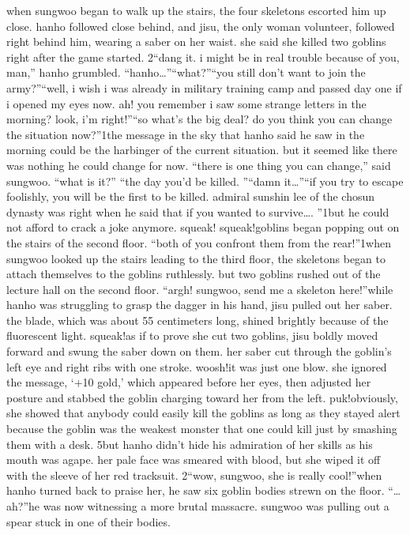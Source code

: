 when sungwoo began to walk up the stairs, the four skeletons escorted him up close.
 hanho followed close behind, and jisu, the only woman volunteer, followed right behind him, wearing a saber on her waist.
 she said she killed two goblins right after the game started.
2“dang it.
 i might be in real trouble because of you, man,” hanho grumbled.
“hanho…”“what?”“you still don’t want to join the army?”“well, i wish i was already in military training camp and passed day one if i opened my eyes now.
 ah! you remember i saw some strange letters in the morning? look, i’m right!”“so what’s the big deal? do you think you can change the situation now?”1the message in the sky that hanho said he saw in the morning could be the harbinger of the current situation.
 but it seemed like there was nothing he could change for now.
“there is one thing you can change,” said sungwoo.
“what is it?”
“the day you’d be killed.
”“damn it…”“if you try to escape foolishly, you will be the first to be killed.
 admiral sunshin lee of the chosun dynasty was right when he said that if you wanted to survive….
”1but he could not afford to crack a joke anymore.
squeak! squeak!goblins began popping out on the stairs of the second floor.
“both of you confront them from the rear!”1when sungwoo looked up the stairs leading to the third floor, the skeletons began to attach themselves to the goblins ruthlessly.
 but two goblins rushed out of the lecture hall on the second floor.
“argh! sungwoo, send me a skeleton here!”while hanho was struggling to grasp the dagger in his hand, jisu pulled out her saber.
 the blade, which was about 55 centimeters long, shined brightly because of the fluorescent light.
squeak!as if to prove she cut two goblins, jisu boldly moved forward and swung the saber down on them.
her saber cut through the goblin’s left eye and right ribs with one stroke.
woosh!it was just one blow.
 she ignored the message, ‘+10 gold,’ which appeared before her eyes, then adjusted her posture and stabbed the goblin charging toward her from the left.
puk!obviously, she showed that anybody could easily kill the goblins as long as they stayed alert because the goblin was the weakest monster that one could kill just by smashing them with a desk.
5but hanho didn’t hide his admiration of her skills as his mouth was agape.
 her pale face was smeared with blood, but she wiped it off with the sleeve of her red tracksuit.
2“wow, sungwoo, she is really cool!”when hanho turned back to praise her, he saw six goblin bodies strewn on the floor.
“…ah?”he was now witnessing a more brutal massacre.
 sungwoo was pulling out a spear stuck in one of their bodies.
